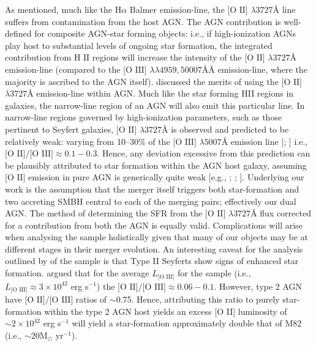 As mentioned, much like the $\text{H}\alpha$ Balmer emission-line, the $\text{[O II]}$  $\lambda{3727}Å$ line suffers from contamination from the host AGN. The AGN contribution is well-defined for composite AGN-star forming objects: i.e., if high-ionization AGNs play host to substantial levels of ongoing star formation, the integrated contribution from $\text{H II}$ regions will increase the intensity of the $\text{[O II]}$ $\lambda3727Å$  emission-line (compared to the $\text{[O III] }\lambda\lambda4959,50007ÅÅ$ emission-line, where the majority is ascribed to the AGN itself). \cite{2005ApJ...629..680H} discussed the merits of using the $\text{[O II]}$ $\lambda{3727}Å$ emission-line within AGN. Much like the star forming HII regions in galaxies, the narrow-line region of an AGN will also emit this particular line. In narrow-line regions governed by high-ionization parameters, such as those pertinent to Seyfert galaxies, $\text{[O II]}$ $\lambda{3727}Å$ is observed and predicted to be relatively weak: varying from 10--30\% of the $\text{[O III]}$ $\lambda{5007}Å$ emission line [\cite{Ferland_1986}; \cite{Ho_1993}] i.e., $\text{[O II]/[O III]}\approx{0.1-0.3}$. Hence, any deviation excessive from this prediction can be plausibly attributed to star formation within the AGN host galaxy, assuming $\text{[O II]}$ emission in pure AGN is generically quite weak [e.g., \cite{Ferland_1986}; \cite{Ho_1993}; \cite{2006ApJ...642..702K}]. Underlying our work is the assumption that the merger itself triggers both star-formation and two accreting SMBH central to each of the merging pairs; effectively our dual AGN. The method of determining the SFR from the $\text{[O II]}$ $\lambda{3727}Å$ flux corrected for a contribution from both the AGN is equally valid. Complications will arise when analysing the sample holistically given that many of our objects may be at different stages in their merger evolution. An interesting caveat for the analysis outlined by \cite{2006ApJ...642..702K} of the \cite{Zakamska2003} sample is that Type II Seyferts show signs of enhanced star formation. \cite{2006ApJ...642..702K} argued that for the average $L_{\text{[O III]}}$ for the \cite{Zakamska2003} sample (i.e., $L_{\text{[O III]}}\approx{3\times{10^{42}}}$ erg s$^{-1}$) the $\text{[O II]/[O III]}\approx{0.06-0.1}$. However, type 2 AGN have $\text{[O II]/[O III]}$ ratios of $\sim$0.75. Hence, attributing this ratio to purely star-formation within the type 2 AGN host yields an excess [O II] luminosity of $\sim{2\times{10^{42}}}$ erg s$^{-1}$ will yield a star-formation approximately double that of M82 (i.e., $\sim$20M$_{\odot}$ yr$^{-1}$).

